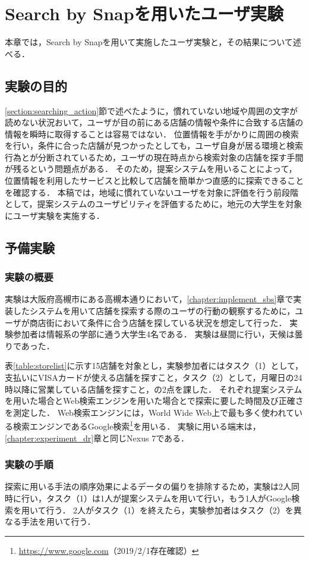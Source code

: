 \chapter{Search by Snapを用いたユーザ実験}
\label{chapter:experiment_sbs}
本章では，Search by Snapを用いて実施したユーザ実験と，その結果について述べる．
\section{実験の目的}
  \ref{section:searching_action}節で述べたように，慣れていない地域や周囲の文字が読めない状況おいて，ユーザが目の前にある店舗の情報や条件に合致する店舗の情報を瞬時に取得することは容易ではない．
  位置情報を手がかりに周囲の検索を行い，条件に合った店舗が見つかったとしても，ユーザ自身が居る環境と検索行為とが分断されているため，ユーザの現在時点から検索対象の店舗を探す手間が残るという問題点がある．
  そのため，提案システムを用いることによって，位置情報を利用したサービスと比較して店舗を簡単かつ直感的に探索できることを確認する．
  本稿では，地域に慣れていないユーザを対象に評価を行う前段階として，提案システムのユーザビリティを評価するために，地元の大学生を対象にユーザ実験を実施する．

\section{予備実験}
  \subsection{実験の概要}
    実験は大阪府高槻市にある高槻本通りにおいて，\ref{chapter:implement_sbs}章で実装したシステムを用いて店舗を探索する際のユーザの行動の観察するために，ユーザが商店街において条件に合う店舗を探している状況を想定して行った．
    実験参加者は情報系の学部に通う大学生4名である．
    実験は昼間に行い，天候は曇りであった．

    表\ref{table:storelist}に示す15店舗を対象とし，実験参加者にはタスク（1）として，支払いにVISAカードが使える店舗を探すこと，タスク（2）として，月曜日の24時以降に営業している店舗を探すこと，の2点を課した．
    それぞれ提案システムを用いた場合とWeb検索エンジンを用いた場合とで探索に要した時間及び正確さを測定した．
    Web検索エンジンには，World Wide Web上で最も多く使われている検索エンジン\cite{Alexa:2019}であるGoogle検索\footnote{\url{https://www.google.com}（2019/2/1存在確認）}を用いる．
    実験に用いる端末は，\ref{chapter:experiment_dr}章と同じNexus 7である．
    
  \subsection{実験の手順}
    探索に用いる手法の順序効果によるデータの偏りを排除するため，実験は2人同時に行い，タスク（1）は1人が提案システムを用いて行い，もう1人がGoogle検索を用いて行う．
    2人がタスク（1）を終えたら，実験参加者はタスク（2）を異なる手法を用いて行う．


